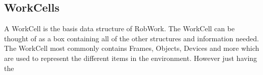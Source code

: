 \subsection{WorkCells}
A WorkCell is the basis data structure of RobWork. The WorkCell can be thought of as a box containing all of the other structures and information needed. The WorkCell most commonly contains Frames, Objects, Devices and more which are used to represent the different items in the environment. However just having the 

